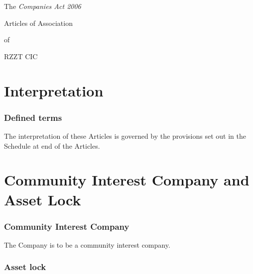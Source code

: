 \documentclass[a4paper,12pt]{article}
\begin{document}
\begin{center}
The \textit{Companies Act 2006}\par Articles of Association\par of\par RZZT CIC
\end{center}

\part{Interpretation}

\section{Defined terms}

The interpretation of these Articles is governed by the provisions set out in the Schedule at end of the Articles.

\part{Community Interest Company and Asset Lock}

\section{Community Interest Company}

The Company is to be a community interest company. %

\section{Asset lock}
\end{document}
